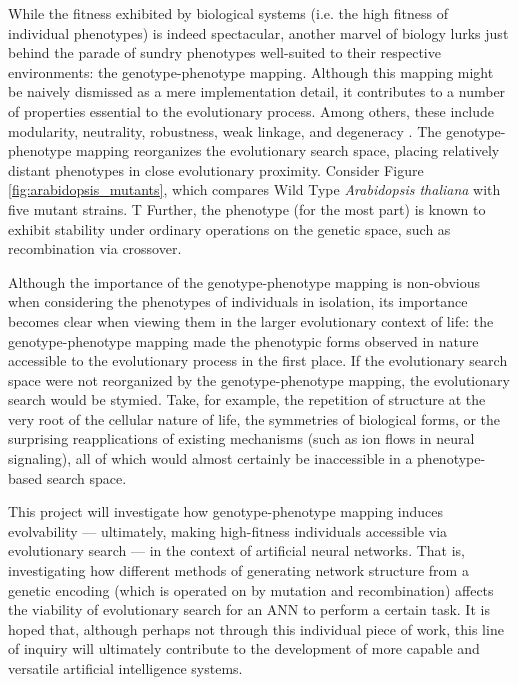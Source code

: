 While the fitness exhibited by biological systems (i.e. the high fitness of individual phenotypes) is indeed spectacular, another marvel of biology lurks just behind the parade of sundry phenotypes well-suited to their respective environments: the genotype-phenotype mapping. Although this mapping might be naively dismissed as a mere implementation detail, it contributes to a number of properties essential to the evolutionary process. Among others, these include modularity, neutrality, robustness, weak linkage, and degeneracy \cite{Richter2015EvolvabilitySurvey, Downing2015IntelligenceSystems}.  The genotype-phenotype mapping reorganizes the evolutionary search space, placing relatively distant phenotypes in close evolutionary proximity. Consider Figure \ref{fig:arabidopsis_mutants}, which compares Wild Type \textit{Arabidopsis thaliana} with five mutant strains. T  Further, the phenotype (for the most part) is known to exhibit stability under ordinary operations on the genetic space, such as recombination via crossover.

Although the importance of the genotype-phenotype mapping is non-obvious when considering the phenotypes of individuals in isolation, its importance becomes clear when viewing them in the larger evolutionary context of life: the genotype-phenotype mapping made the phenotypic forms observed in nature accessible to the evolutionary process in the first place. If the evolutionary search space were not reorganized by the genotype-phenotype mapping, the evolutionary search would be stymied.  Take, for example, the repetition of structure at the very root of the cellular nature of life, the symmetries of biological forms, or the surprising  reapplications of existing mechanisms (such as ion flows in neural signaling), all of which would almost certainly be inaccessible in a phenotype-based search space.

This project will investigate how genotype-phenotype mapping induces evolvability --- ultimately, making high-fitness individuals accessible via evolutionary search --- in the context of artificial neural networks. That is, investigating how different methods of generating network structure from a genetic encoding (which is operated on by mutation and recombination) affects the viability of evolutionary search for an ANN to perform a certain task. It is hoped that, although perhaps not through this individual piece of work, this line of inquiry will ultimately contribute to the development of more capable and versatile artificial intelligence systems.
